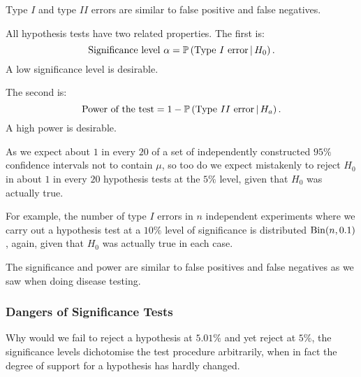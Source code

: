 \documentclass[10pt, a4paper]{article}
\begin{document}
\begin{remark}
    Type $I$ and type $II$ errors are similar to false positive and false negatives.
\end{remark}

\begin{definition}
    All hypothesis tests have two related properties.
    The first is:
    \[
    \text{Significance level $\alpha$} = \mathbb{P}\left(\text{Type $I$ error} \,\middle|\, H_0\right).
    \]
    A low significance level is desirable.

    The second is:
    \[
    \text{Power of the test} = 1 - \mathbb{P}\left(\text{Type $II$ error} \,\middle|\, H_a\right).
    \]
    A high power is desirable.
\end{definition}

As we expect about $1$ in every $20$ of a set of independently constructed $95\%$ confidence intervals not to contain $\mu$,
so too do we expect mistakenly to reject $H_0$ in about $1$ in every $20$ hypothesis tests at the $5\%$ level,
given that $H_0$ was actually true.

For example,
the number of type $I$ errors in $n$ independent experiments where we carry out a hypothesis test at a $10\%$ level of significance is distributed $\operatorname{Bin}(n, 0.1)$,
again,
given that $H_0$ was actually true in each case.

The significance and power are similar to false positives and false negatives as we saw when doing disease testing.

\subsubsection{Dangers of Significance Tests}
Why would we fail to reject a hypothesis at $5.01\%$ and yet reject at $5\%$,
the significance levels dichotomise the test procedure arbitrarily,
when in fact the degree of support for a hypothesis has hardly changed.
\end{document}
